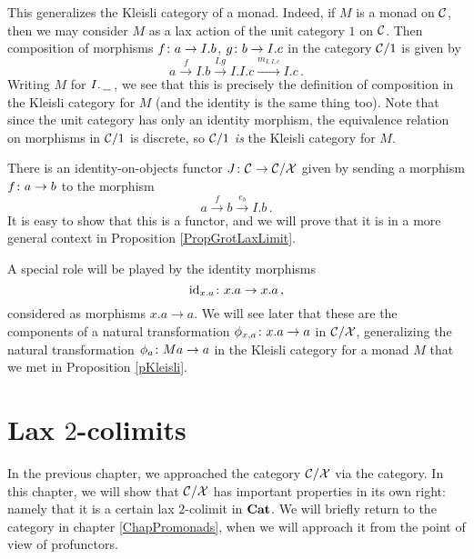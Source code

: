 \begin{remark}
  This generalizes the Kleisli category of a monad.  
  Indeed, if $M$ is a monad on ${\mathcal{C}}$, then we may consider $M$ as a lax action of the unit category $1$ on ${\mathcal{C}}$.
  Then composition of morphisms $f \colon a \to I.b$, $g \colon b \to I.c$ in the category ${\mathcal{C}}/1$ is given by
  \[
    a \xrightarrow{f}
    I.b \xrightarrow{I.g}
    I.I.c \xrightarrow{m_{I,I,c}}
    I.c\,.
    \]
  Writing $M$ for $I.\,\underline{\hspace{1.5ex}}\,$, we see that this is precisely the definition of composition in the Kleisli category for $M$ (and the identity is the same thing too).  
  Note that since the unit category has only an identity morphism, the equivalence relation on morphisms in ${\mathcal{C}}/1$ is discrete, so ${\mathcal{C}}/1$ \emph{is} the Kleisli category for $M$.
\end{remark}

There is an identity-on-objects functor $J \colon {\mathcal{C}} \to {\mathcal{C}}/\mathcal X$ given by sending a morphism $f \colon a \to b$ to the \Mellies morphism
\[
  a \xrightarrow{f}
  b \xrightarrow{e_b}
  I.b\,.
  \]
It is easy to show that this is a functor, and we will prove that it is in a more general context in Proposition \ref{PropGrotLaxLimit}.

A special role will be played by the identity morphisms
\[
  \operatorname{id}_{x.a} \colon x.a \to x.a\,,
  \]
considered as \Mellies morphisms $x.a \to a$.  
We will see later that these are the components of a natural transformation $\phi_{x,a}\colon x.a \to a$ in ${\mathcal{C}}/\mathcal X$, generalizing the natural transformation $\phi_a \colon Ma \to a$ in the Kleisli category for a monad $M$ that we met in Proposition \ref{pKleisli}.

\section{Lax $2$-colimits}

In the previous chapter, we approached the category ${\mathcal{C}}/\mathcal X$ via the \Mellies category.  
In this chapter, we will show that ${\mathcal{C}}/\mathcal X$ has important properties in its own right: namely that it is a certain lax $2$-colimit in ${\normalfont\textbf{Cat}}$.  
We will briefly return to the \Mellies category in chapter \ref{ChapPromonads}, when we will approach it from the point of view of profunctors.

